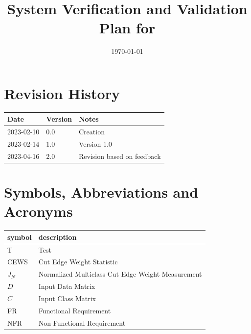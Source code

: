 \documentclass[12pt, titlepage]{article}
\begin{document}
\title{System Verification and Validation Plan for \progname{}} 
\author{\authname}
\date{\today}
	
\maketitle


\section{Revision History}

\begin{tabularx}{\textwidth}{p{3cm}p{2cm}X}
\toprule {\bf Date} & {\bf Version} & {\bf Notes}\\
\midrule
2023-02-10 & 0.0 & Creation\\
2023-02-14 & 1.0 & Version 1.0\\
2023-04-16 & 2.0 & Revision based on feedback \\
\bottomrule
\end{tabularx}

\newpage

\tableofcontents

\newpage

\listoftables
{}

{}

\newpage

\section{Symbols, Abbreviations and Acronyms}

\renewcommand{\arraystretch}{1.2}
\begin{tabular}{l l} 
  \toprule		
  \textbf{symbol} & \textbf{description}\\
  \midrule 
  T & Test\\
  CEWS & Cut Edge Weight Statistic\\
  $J_N$ & Normalized Multiclass Cut Edge Weight Measurement\\
  $D$ & Input Data Matrix\\
  $C$ & Input Class Matrix\\
  FR & Functional Requirement \\
  NFR & Non Functional Requirement \\
  \bottomrule
\end{tabular}\\
\end{document}
